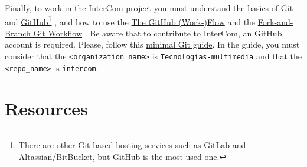 Finally, to work in the
\href{https://github.com/Tecnologias-multimedia/intercom}{InterCom}
project \cite{intercom} you must understand the basics of Git
\cite{Git-book} and \href{https://github.com/}{GitHub}\footnote{There
are other Git-based hosting services such as
\href{https://about.gitlab.com/}{GitLab} and
\href{https://www.atlassian.com/git}{Altassian}/\href{https://bitbucket.org/product}{BitBucket},
but GitHub is the most used one.} \cite{GitHub}, and how to use the
\href{https://guides.github.com/introduction/flow/index.html}{The
  GitHub (Work-)Flow} and the
\href{https://github.com/vicente-gonzalez-ruiz/fork_and_branch_git_workflow}{Fork-and-Branch
  Git Workflow} \cite{fork-and-branch-git-workflow}. Be aware that to
contribute to InterCom, an GitHub account is required. Please, follow
this
\href{https://vicente-gonzalez-ruiz.github.io/using_GitHub/}{minimal
  Git guide}. In the guide, you must consider that the
\texttt{<organization\_name>} is \texttt{Tecnologias-multimedia} and
that the \texttt{<repo\_name>} is \texttt{intercom}.

\section{Resources}


